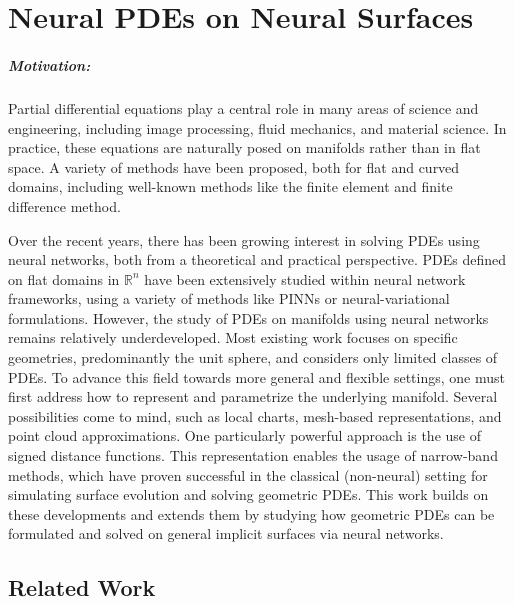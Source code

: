\documentclass[12pt,openany]{book}
\newcommand{\R}{\mathbb{R}}
\theoremstyle{plainnormal}
\theoremstyle{remark}
\begin{document}
\chapter{Neural PDEs on Neural Surfaces}\label{NPDEsonSurfaces} 
\paragraph{Motivation:} Partial differential equations play a central role in many areas of science and engineering, including image processing, fluid mechanics, and material science. In practice, these equations are naturally posed on manifolds rather than in flat space. A variety of methods have been proposed, both for flat and curved domains, including well-known methods like the finite element and finite difference method. \par
Over the recent years, there has been growing interest in solving PDEs using neural networks, both from a theoretical and practical perspective. PDEs defined on flat domains in $\R^n$ have been extensively studied within neural network frameworks, using a variety of methods like PINNs or neural-variational formulations. However, the study of PDEs on manifolds using neural networks remains relatively underdeveloped. Most existing work focuses on specific geometries, predominantly the unit sphere, and considers only limited classes of PDEs.
To advance this field towards more general and flexible settings, one must first address how to represent and parametrize the underlying manifold. Several possibilities come to mind, such as local charts, mesh-based representations, and point cloud approximations. One particularly powerful approach is the use of signed distance functions. This representation enables the usage of narrow-band methods, which have proven successful in the classical (non-neural) setting for simulating surface evolution and solving geometric PDEs. %
This work builds on these developments and extends them by studying how geometric PDEs can be formulated and solved on general implicit surfaces via neural networks.
\section{Related Work}
\end{document}
